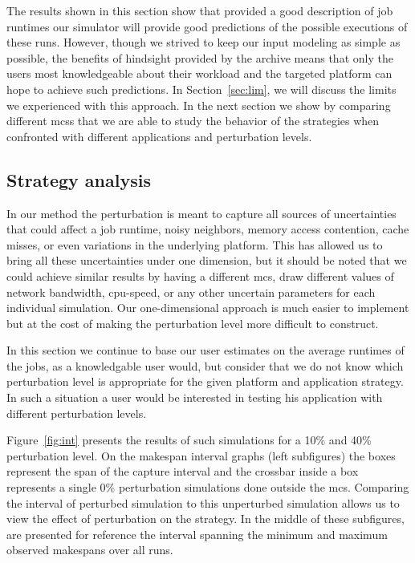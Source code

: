 \documentclass[10pt,conference,compsocconf]{IEEEtran}
\begin{document}
The results shown in  this section show that provided a  good description of job
runtimes our simulator will provide  good predictions of the possible executions
of these runs. However, though we strived to keep our input modeling as simple
as possible, the  benefits of hindsight provided by the  archive means that only
the users most knowledgeable about their  workload and the targeted platform can
hope to achieve such predictions.  In Section~\ref{sec:lim}, we will discuss the
limits we experienced with this approach. In the next section we show by comparing
different \acp{mcs}  that we are able  to study the behavior  of the strategies
when confronted with different applications and perturbation levels.


\subsection{Strategy analysis}\label{sec:sa}

In our method the perturbation is meant to capture all sources of uncertainties
that could affect a job runtime, noisy neighbors, memory access contention,
cache misses, or even variations in the underlying platform. This has allowed us
to bring all these uncertainties under one dimension, but it should be noted that
we could achieve similar results by having a different \ac{mcs}, draw different values
of network bandwidth, cpu-speed, or any other uncertain parameters for each
individual simulation. Our one-dimensional approach is much easier to implement
but at the cost of making the perturbation level more difficult to construct.

In this section we  continue to base our user estimates  on the average runtimes
of the  jobs, as a  knowledgable user  would, but consider  that we do  not know
which perturbation  level is appropriate for the given platform  and application
strategy.   In such  a  situation a  user  would be  interested  in testing  his
application with different perturbation levels.

Figure~\ref{fig:int} presents  the results  of such simulations  for a  10\% and
40\% perturbation level.  On the  makespan interval graphs (left subfigures) the
boxes represent the span  of the capture interval and the  crossbar inside a box
represents   a   single   0\%   perturbation  simulations   done   outside   the
\ac{mcs}. Comparing  the interval  of perturbed  simulation to  this unperturbed
simulation allows us to view the effect  of perturbation on the strategy. In the
middle of these subfigures,  are presented  for  reference the  interval 
spanning  the minimum and maximum observed makespans over all runs.
\end{document}

